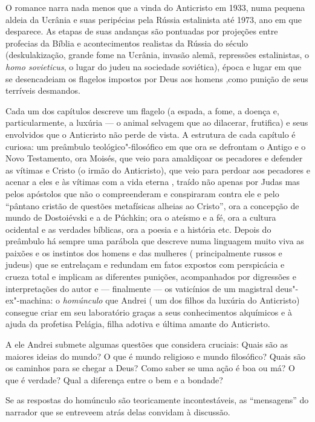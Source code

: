 O romance narra nada menos que a vinda do Anticristo em 1933, numa
pequena aldeia da Ucrânia e suas peripécias pela Rússia estalinista até
1973, ano em que desparece. As etapas de suas andanças são pontuadas por
projeções entre profecias da Bíblia e acontecimentos realistas da Rússia
do século  (deskulakização, grande fome na Ucrânia, invasão alemã,
repressões estalinistas, o \emph{homo sovieticus}, o lugar do judeu na
sociedade soviética), época e lugar em que se desencadeiam os flagelos
impostos por Deus aos homens ,como punição de seus terríveis desmandos.

Cada um dos capítulos descreve um flagelo (a espada, a fome, a doença e,
particularmente, a luxúria --- o animal selvagem que ao dilacerar,
frutifica) e seus envolvidos que o Anticristo não perde de vista. A
estrutura de cada capítulo é curiosa: um preâmbulo teológico"-filosófico
em que ora se defrontam o Antigo e o Novo Testamento, ora Moisés, que
veio para amaldiçoar os pecadores e defender as vítimas e Cristo (o
irmão do Anticristo), que veio para perdoar aos pecadores e acenar a
eles e às vítimas com a vida eterna , traído não apenas por Judas mas
pelos apóstolos que não o compreenderam e conspiraram contra ele e pelo
``pântano cristão de questões metafísicas alheias ao Cristo'', ora a
concepção de mundo de Dostoiévski e a de Púchkin; ora o ateísmo e a fé,
ora a cultura ocidental e as verdades bíblicas, ora a poesia e a
história etc. Depois do preâmbulo há sempre uma parábola que descreve
numa linguagem muito viva as paixões e os instintos dos homens e das
mulheres ( principalmente russos e judeus) que se entrelaçam e redundam
em fatos expostos com perspicácia e crueza total e implicam as
diferentes punições, acompanhados por digressões e interpretações do
autor e --- finalmente --- os vaticínios de um magistral deus"-ex"-machina:
o \emph{homúnculo} que Andrei ( um dos filhos da luxúria do Anticristo)
consegue criar em seu laboratório graças a seus conhecimentos alquímicos
e à ajuda da profetisa Pelágia, filha adotiva e última amante do
Anticristo.

A ele Andrei submete algumas questões que considera cruciais: Quais são
as maiores ideias do mundo? O que é mundo religioso e mundo filosófico?
Quais são os caminhos para se chegar a Deus? Como saber se uma ação é
boa ou má? O que é verdade? Qual a diferença entre o bem e a bondade?

Se as respostas do homúnculo são teoricamente incontestáveis, as
``mensagens'' do narrador que se entreveem atrás delas convidam à
discussão.

